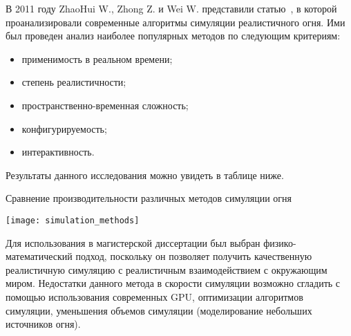 В 2011 году ZhaoHui W., Zhong Z. и Wei W. представили статью~\cite{survey}, в
которой проанализировали
современные алгоритмы симуляции реалистичного огня. Ими был проведен анализ
наиболее популярных методов по следующим критериям:
\begin{itemize}
	\item применимость в реальном времени;
	\item степень реалистичности;
	\item пространственно-временная сложность;
	\item конфигурируемость;
	\item интерактивность.
\end{itemize}
Результаты данного исследования можно увидеть в таблице ниже.

\begin{table}[htb]
    \caption{Сравнение производительности различных методов симуляции огня}
    \texttt{[image: simulation\_methods]}
\end{table}

Для использования в магистерской диссертации был выбран физико-математический
подход, поскольку он позволяет получить качественную реалистичную симуляцию с
реалистичным взаимодействием с окружающим миром. Недостатки данного метода в
скорости симуляции возможно сгладить с помощью использования современных GPU,
оптимизации алгоритмов симуляции, уменьшения объемов симуляции (моделирование
небольших источников огня).
